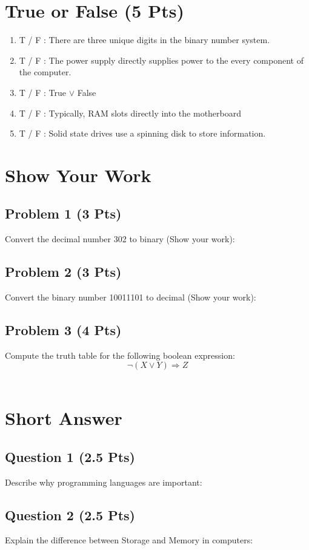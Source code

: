 \documentclass{article}
\begin{document}
\pagestyle{fancy}
\section{True or False (5 Pts)}
\begin{enumerate}
    \item T / F : There are three unique digits in the binary number system.
    \item T / F : The power supply directly supplies power to the every component of the computer.
    \item T / F : True $\lor$ False
    \item T / F : Typically, RAM slots directly into the motherboard
    \item T / F : Solid state drives use a spinning disk to store information.
\end{enumerate}

\section{Show Your Work}
\subsection*{Problem 1 (3 Pts)}
Convert the decimal number 302 to binary (Show your work):
\\[3.5in]
\subsection*{Problem 2 (3 Pts)}
Convert the binary number 10011101 to decimal (Show your work):
\newpage
\subsection*{Problem 3 (4 Pts)}
Compute the truth table for the following boolean expression: 
\[
    \lnot (X \lor Y) \Rightarrow  Z
\]
~
\\[3.5in]
\section{Short Answer}
\subsection*{Question 1 (2.5 Pts)}
Describe why programming languages are important:

\newpage
\subsection*{Question 2 (2.5 Pts)}
Explain the difference between Storage and Memory in computers:
\end{document}
